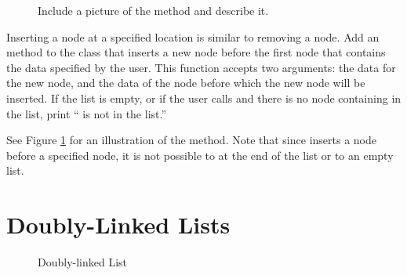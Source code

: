 \begin{figure}
\centering
\caption{Include a picture of the  method and describe it.}
\label{fig:insert}
\end{figure}

\begin{problem}
Inserting a node at a specified location is similar to removing a node.
Add an  method to the  class that inserts a new node before the first node that contains the data specified by the user.
This function accepts two arguments: the data for the new node, and the data of the node before which the new node will be inserted.
If the list is empty, or if the user calls  and there is no node containing  in the list, print `` is not in the list.''

See Figure \ref{fig:insert} for an illustration of the  method.
Note that since  inserts a node before a specified node, it is not possible to  at the end of the list or to an empty list.
\end{problem}

\section*{Doubly-Linked Lists}

\begin{figure}
\centering
{}
\caption{Doubly-linked List}
\label{fig:doubly_linked}
\end{figure}

